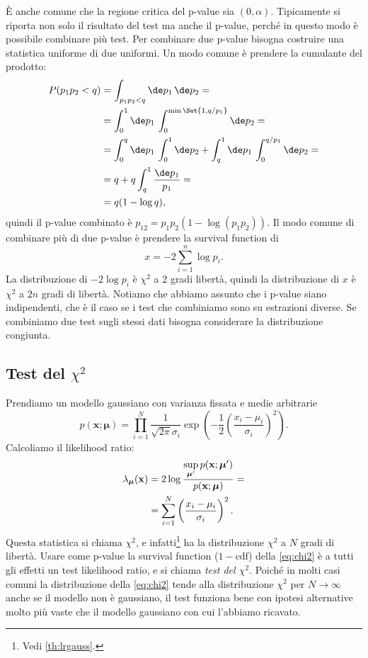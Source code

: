 \noindent È anche comune che la regione critica del p-value sia $(0,\alpha)$.
Tipicamente si riporta non solo il risultato del test ma anche il p-value,
perché in questo modo è possibile combinare più test.
Per combinare due p-value bisogna costruire una statistica uniforme di due uniformi.
Un modo comune è prendere la cumulante del prodotto:
\begin{align*}
	P(p_1p_2<q)
	&= \int_{p_1p_2<q}\de p_1\,\de p_2 = \\
	&= \int_0^1\de p_1\, \int_0^{\min\Set{1,q/p_1}} \de p_2 = \\
	&= \int_0^q\de p_1\, \int_0^1 \de p_2
	+ \int_q^1 \de p_1\, \int_0^{q/p_1} \de p_2 = \\
	&= q + q\int_q^1 \frac{\de p_1}{p_1} = \\
	&= q(1-\log q),
\end{align*}
quindi il p-value combinato è $p_{12} = p_1p_2(1-\log(p_1p_2))$.
Il modo comune di combinare più di due p-value è prendere la survival function di
\begin{equation*}
	x = -2 \sum_{i=1}^n \log p_i.
\end{equation*}
La distribuzione di $-2\log p_i$ è $\chi^2$ a 2 gradi libertà,
quindi la distribuzione di $x$ è $\chi^2$ a $2n$ gradi di libertà.
Notiamo che abbiamo assunto che i p-value siano indipendenti,
che è il caso se i test che combiniamo sono su estrazioni diverse.
Se combiniamo due test sugli stessi dati
bisogna considerare la distribuzione congiunta.

\subsection{Test del $\chi^2$}

Prendiamo un modello gaussiano con varianza fissata e medie arbitrarie
\begin{equation*}
	p(\mathbf x;\boldsymbol\mu)
	= \prod_{i=1}^N \frac1{\sqrt{2\pi}\sigma_i}
	\exp\left(-\frac12\left(\frac{x_i-\mu_i}{\sigma_i}\right)^2\right).
\end{equation*}
Calcoliamo il likelihood ratio:
\begin{align}
	\lambda_{\boldsymbol\mu}(\mathbf x)
	&= 2\log \frac
	{\sup\limits_{\boldsymbol\mu'} p(\mathbf x;\boldsymbol\mu')}
	{p(\mathbf x;\boldsymbol\mu)} = \notag \\
	&= \sum_{i=1}^N \left(\frac{x_i-\mu_i}{\sigma_i}\right)^2. \label{eq:chi2}
\end{align}
Questa statistica si chiama $\chi^2$,
e infatti\footnote{Vedi \autoref{th:lrgauss}.} ha la distribuzione $\chi^2$ a $N$ gradi di libertà.
Usare come p-value la survival function ($1-\text{cdf}$) della \eqref{eq:chi2}
è a tutti gli effetti un test likelihood ratio,
e si chiama \emph{test del $\chi^2$}.
Poiché in molti casi comuni la distribuzione della \eqref{eq:chi2} tende alla distribuzione $\chi^2$
per $N\to\infty$ anche se il modello non è gaussiano,
il test funziona bene con ipotesi alternative molto più vaste che il modello gaussiano con cui l'abbiamo ricavato.

